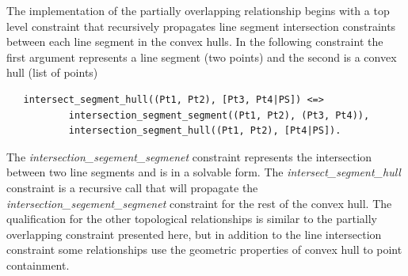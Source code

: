 \documentclass[12pt]{ucthesis}
\begin{document}


The implementation of the partially overlapping relationship begins with a top level constraint that recursively propagates line segment intersection constraints between each line segment in the convex hulls. In the following constraint the first argument represents a line segment (two points) and the second is a convex hull (list of points)
\begin{verbatim}
   intersect_segment_hull((Pt1, Pt2), [Pt3, Pt4|PS]) <=>
           intersection_segment_segment((Pt1, Pt2), (Pt3, Pt4)),
           intersection_segment_hull((Pt1, Pt2), [Pt4|PS]).
\end{verbatim} The \emph{intersection\_segement\_segmenet} constraint represents the intersection between two line segments and is in a solvable form. The \emph{intersect\_segment\_hull} constraint is a recursive call that will propagate the \emph{intersection\_segement\_segmenet} constraint for the rest of the convex hull. The qualification for the other topological relationships is similar to the partially overlapping constraint presented here, but in addition to the line intersection constraint some relationships use the geometric properties of convex hull to point containment.


\end{document}
